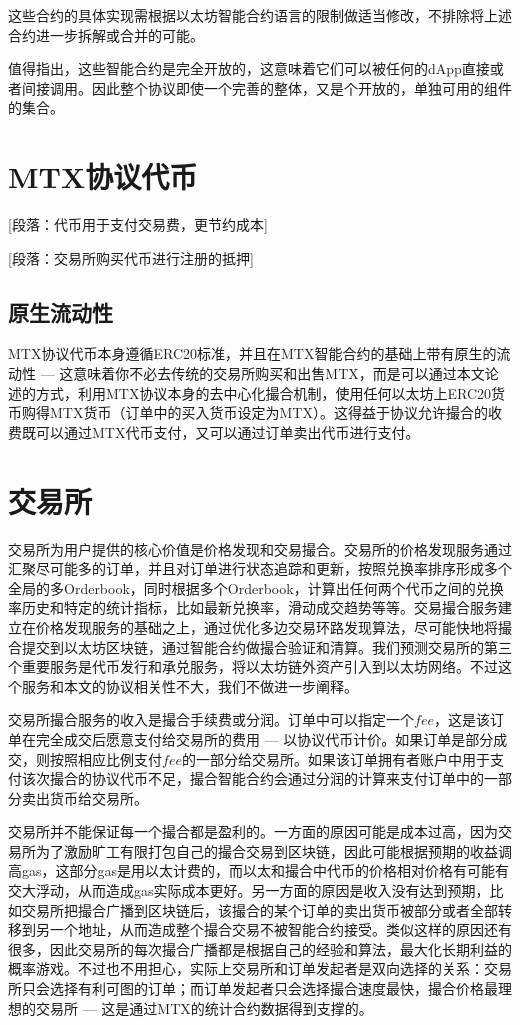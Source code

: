 \documentclass[UTF8,nofonts]{ctexart}
\begin{document}
这些合约的具体实现需根据以太坊智能合约语言的限制做适当修改，不排除将上述合约进一步拆解或合并的可能。

值得指出，这些智能合约是完全开放的，这意味着它们可以被任何的dApp直接或者间接调用。因此整个协议即使一个完善的整体，又是个开放的，单独可用的组件的集合。

\section{MTX协议代币\label{sec:protocoltoken}}



[段落：代币用于支付交易费，更节约成本]

[段落：交易所购买代币进行注册的抵押]

\subsection{原生流动性}

MTX协议代币本身遵循ERC20标准，并且在MTX智能合约的基础上带有原生的流动性 --- 这意味着你不必去传统的交易所购买和出售MTX，而是可以通过本文论述的方式，利用MTX协议本身的去中心化撮合机制，使用任何以太坊上ERC20货币购得MTX货币（订单中的买入货币设定为MTX）。这得益于协议允许撮合的收费既可以通过MTX代币支付，又可以通过订单卖出代币进行支付。


\section{交易所\label{sec:exchange}}

交易所为用户提供的核心价值是价格发现和交易撮合。交易所的价格发现服务通过汇聚尽可能多的订单，并且对订单进行状态追踪和更新，按照兑换率排序形成多个全局的多Orderbook，同时根据多个Orderbook，计算出任何两个代币之间的兑换率历史和特定的统计指标，比如最新兑换率，滑动成交趋势等等。交易撮合服务建立在价格发现服务的基础之上，通过优化多边交易环路发现算法，尽可能快地将撮合提交到以太坊区块链，通过智能合约做撮合验证和清算。我们预测交易所的第三个重要服务是代币发行和承兑服务，将以太坊链外资产引入到以太坊网络。不过这个服务和本文的协议相关性不大，我们不做进一步阐释。

交易所撮合服务的收入是撮合手续费或分润。订单中可以指定一个$fee$，这是该订单在完全成交后愿意支付给交易所的费用 --- 以协议代币计价。如果订单是部分成交，则按照相应比例支付$fee$的一部分给交易所。如果该订单拥有者账户中用于支付该次撮合的协议代币不足，撮合智能合约会通过分润的计算来支付订单中的一部分卖出货币给交易所。

交易所并不能保证每一个撮合都是盈利的。一方面的原因可能是成本过高，因为交易所为了激励旷工有限打包自己的撮合交易到区块链，因此可能根据预期的收益调高gas，这部分gas是用以太计费的，而以太和撮合中代币的价格相对价格有可能有交大浮动，从而造成gas实际成本更好。另一方面的原因是收入没有达到预期，比如交易所把撮合广播到区块链后，该撮合的某个订单的卖出货币被部分或者全部转移到另一个地址，从而造成整个撮合交易不被智能合约接受。类似这样的原因还有很多，因此交易所的每次撮合广播都是根据自己的经验和算法，最大化长期利益的概率游戏。不过也不用担心，实际上交易所和订单发起者是双向选择的关系：交易所只会选择有利可图的订单；而订单发起者只会选择撮合速度最快，撮合价格最理想的交易所 --- 这是通过MTX的统计合约数据得到支撑的。
\end{document}
